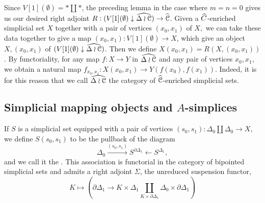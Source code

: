 Since \(V[1](\emptyset)=\ast\coprod \ast\), the preceding lemma in the case where \(m=n=0\) gives us our desired right adjoint \(R:{(V[1](\emptyset)\downarrow \widehat{\Delta\wr\mathcal{C}})}\to \widehat{\mathcal{C}}\).  Given a \(\widehat{C}\)-enriched simplicial set \(X\) together with a pair of vertices \((x_0,x_1)\) of \(X,\) we can take these data together to give a map \((x_0,x_1):V[1](\emptyset)\to X\), which give an object \(X,(x_0,x_1)\) of \({(V[1](\emptyset)\downarrow \widehat{\Delta\wr\mathcal{C}})}\).  Then we define \(X(x_0,x_1)=R(X,(x_0,x_1))\).  By functoriality, for any map \(f:X\to Y\) in \(\widehat{\Delta\wr \mathcal{C}}\) and any pair of vertices \(x_0,x_1\), we obtain a natural map \(f_{x_0,x_1}:X(x_0,x_1)\to Y(f(x_0),f(x_1))\).  Indeed, it is for this reason that we call \(\widehat{\Delta\wr\mathcal{C}}\) the category of \(\widehat{\mathcal{C}}\)-enriched simplicial sets.
\subsection{Simplicial mapping objects and $A$-simplices}


\begin{defn} If \(S\) is a simplicial set equipped with a pair of vertices \((s_0,s_1):\Delta_0\coprod \Delta_0 \to X,\) we define \(S(s_0,s_1)\) to be the pullback of the diagram \[\Delta_0 \overset{(s_0,s_1)}{\to} S^{\partial \Delta_1} \leftarrow S^{\Delta_1},\] and we call it the .  This association is functorial in the category of bipointed simplicial sets and admits a right adjoint \(\Sigma\), the unreduced suspension functor, \[K\mapsto \left(\partial \Delta_1\to  K\times \Delta_1 \coprod_{K\times \partial \Delta_1} \Delta_0 \times \partial \Delta_1\right)\]
\end{defn}

